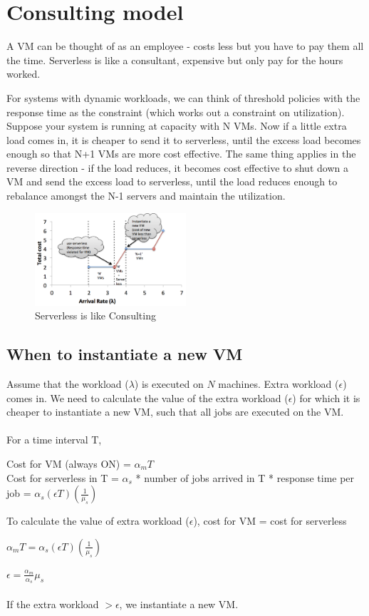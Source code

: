\documentclass[letter,11pt]{article}
\begin{document}
\section{Consulting model}

A VM can be thought of as an employee - costs less but you have to pay them all the time. Serverless is like a consultant, expensive but only pay for the hours worked.

For systems with dynamic workloads, we can think of threshold policies with the response time as the constraint (which works out a constraint on utilization). Suppose your system is running at capacity with N VMs. Now if a little extra load comes in, it is cheaper to send it to serverless, until the excess load becomes enough so that N+1 VMs are more cost effective. The same thing applies in the reverse direction - if the load reduces, it becomes cost effective to shut down a VM and send the excess load to serverless, until the load reduces enough to rebalance amongst the N-1 servers and maintain the utilization.

\begin{figure}[h]
    \centering
    \includegraphics[width=0.5\textwidth]{consulting_model}
    \caption{Serverless is like Consulting}
    \label{fig:model}
\end{figure}

\subsection{When to instantiate a new VM} 

Assume that the workload ($\lambda$) is executed on $N$ machines. Extra workload ($\epsilon$) comes in. We need to calculate the value of the extra workload ($\epsilon$) for which it is cheaper to instantiate a new VM, such that all jobs are executed on the VM. \\ \\ 
For a time interval T, 

Cost for VM (always ON)  = $\alpha_m T$ \\

Cost for serverless in T = $\alpha_s$ * number of jobs arrived in T * response time per job = $\alpha_s (\epsilon T) (\frac{1}{\mu_s})$ 

To calculate the value of extra workload ($\epsilon$), cost for VM = cost for serverless

$\alpha_m T = \alpha_s (\epsilon T) (\frac{1}{\mu_s})$ 

$\epsilon =  \frac{\alpha_m}{\alpha_s} \mu_s$ \\ \\
If the extra workload $> \epsilon$, we instantiate a new VM.
\end{document}
